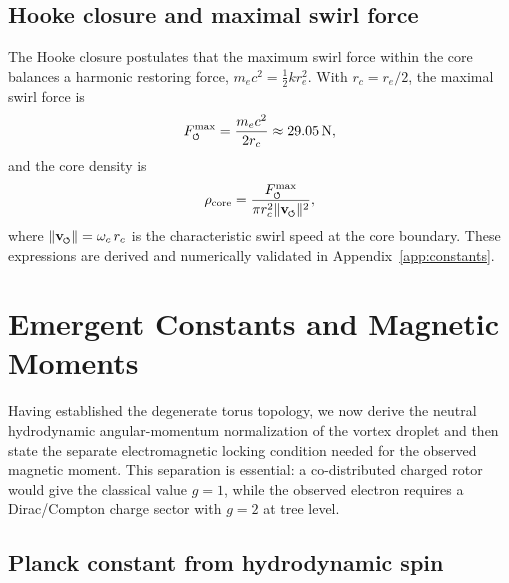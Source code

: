 \documentclass[11pt]{article}
\newcommand{\Fmax}{F^{\max}_{\mkern-1mu\scriptscriptstyle\boldsymbol{\circlearrowleft}}}
\newcommand{\vnorm}{\lVert \mathbf{v}_{\mkern-2mu\scriptscriptstyle\boldsymbol{\circlearrowleft}} \rVert}  %
\newcommand{\rc}{r_c}                                    %
\newcommand{\rhocore}{\rho_{\text{core}}}
\begin{document}
\subsection{Hooke closure and maximal swirl force}

The Hooke closure postulates that the maximum swirl force within the core balances a harmonic restoring force, $m_e c^2 = \tfrac{1}{2} k r_e^2$.  With $\rc = r_e/2$, the maximal swirl force is
\begin{equation}
    \Fmax = \frac{m_e c^2}{2\rc} \approx 29.05\,\text{N},
\end{equation}
and the core density is
\begin{equation}
    \rhocore = \frac{\Fmax}{\pi \rc^2 \vnorm^2},
\end{equation}
where $\vnorm = \omega_c\,\rc$ is the characteristic swirl speed at the core boundary.  These expressions are derived and numerically validated in Appendix~\ref{app:constants}.

\section{Emergent Constants and Magnetic Moments}
\label{sec:emergent_constants}

Having established the degenerate torus topology, we now derive the neutral hydrodynamic angular-momentum normalization of the vortex droplet and then state the separate electromagnetic locking condition needed for the observed magnetic moment.  This separation is essential: a co-distributed charged rotor would give the classical value $g=1$, while the observed electron requires a Dirac/Compton charge sector with $g=2$ at tree level.

\subsection{Planck constant from hydrodynamic spin}
\end{document}
